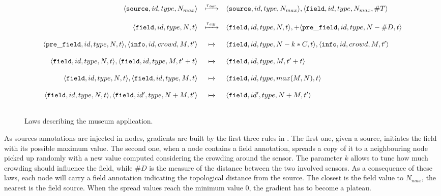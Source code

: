 \documentclass[12pt,a4paper,twoside,openright]{book}
\begin{document}
\begin{figure}
{\footnotesize\[\begin{array}{rcl}

 \langle \mathtt{source}, id, type, N_{max}\rangle  &  \xmapsto{r_{\mathit{init}}} &  \langle \mathtt{source}, id, type, N_{max}\rangle, \langle \mathtt{field}, id, type, N_{max}, \#T\rangle  \\

 & & \\

 \langle \mathtt{field}, id, type, N,  t\rangle & \xmapsto{r_{\mathit{diff}}} &  \langle \mathtt{field}, id, type, N, t\rangle, +\langle \mathtt{pre\_field}, id, type, N-\#D, t\rangle \\
 
  & & \\
 
\langle \mathtt{pre\_field}, id, type, N, t\rangle, \langle \mathtt{info}, id, crowd, M, t'\rangle & \xmapsto{} &  \langle \mathtt{field}, id, type, N-k*C, t\rangle,\langle \mathtt{info}, id, crowd, M, t'\rangle \\

 & & \\

\langle \mathtt{field}, id, type, N, t\rangle, \langle \mathtt{field}, id, type, M, t' +t\rangle & \xmapsto{} & \langle \mathtt{field}, id, type, M, t'+t\rangle\\

 & & \\

\langle \mathtt{field}, id, type, N, t\rangle, \langle \mathtt{field}, id, type, M, t\rangle &\xmapsto{} & \langle \mathtt{field}, id, type, max(M,N),  t\rangle\\
  
 & & \\

\langle \mathtt{field}, id, type, N, t\rangle, \langle \mathtt{field}, id', type, N+M, t'\rangle & \xmapsto{} & \langle \mathtt{field}, id', type, N+M, t'\rangle\\
  

 & & \\

\end{array}\]}
\caption{Laws describing the museum application.}
\label{img:museum-rules}
\end{figure}

As sources annotations are injected in nodes, gradients are built by the first three rules in . 
%
The first one, given a source, initiates the field with its possible maximum value. 
%
The second one, when a node contains a field annotation, spreads a copy of it to a neighbouring node picked up randomly with a new value computed considering the crowding around the sensor. The parameter $k$ allows to tune how much crowding should influence the field, while $\#D$ is the measure of the distance between the two involved sensors. 
%
As a consequence of these laws, each node will carry a field annotation indicating the topological distance from the source. The closest is the field value to $N_{max}$, the nearest is the field source. When the spread values reach the minimum value $0$, the gradient has to become a plateau.
\end{document}
